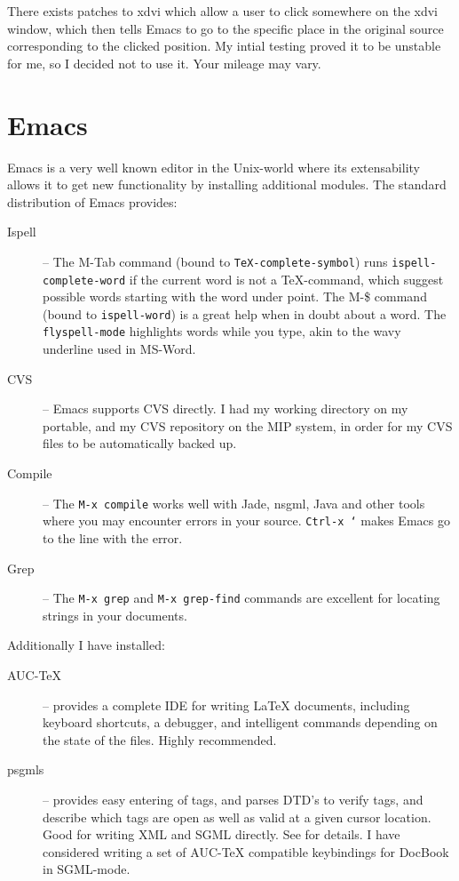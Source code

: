 There exists patches to xdvi which allow a user to click somewhere on
the xdvi window, which then tells Emacs to go to the specific place in
the original source corresponding to the clicked position.  My intial
testing proved it to be unstable for me, so I decided not to use it.
Your mileage may vary.



\section{Emacs} 
\label{sec:report-writing-tools-emacs} 


Emacs is a very well known editor in the Unix-world where its
extensability allows it to get new functionality by installing
additional modules.  The standard distribution of Emacs provides:

\begin{description}
\item[Ispell] -- The M-Tab command (bound to
  \texttt{TeX-complete-symbol}) runs \texttt{ispell-complete-word} if
  the current word is not a {\TeX}-command, which suggest possible
  words starting with the word under point.  The M-\$ command (bound
  to \texttt{ispell-word}) is a great help when in doubt about a
  word.  The \texttt{flyspell-mode} highlights words while you type,
  akin to the wavy underline used in MS-Word. 

\item[CVS] -- Emacs supports CVS directly.  I
  had my working directory on my portable, and my CVS repository on
  the MIP system, in order for my CVS files to be automatically backed
  up. 
\item[Compile] -- The \texttt{M-x compile} works well with Jade,
  nsgml, Java and other tools where you may encounter errors in your
  source.  \texttt{Ctrl-x `} makes Emacs go to the line with the
  error.
\item[Grep] -- The \texttt{M-x grep} and \texttt{M-x grep-find}
  commands are excellent for locating strings in your documents.
\end{description}

Additionally I have installed:


\begin{description}
\item[AUC-TeX] -- provides a complete IDE for writing {\LaTeX}
  documents, including keyboard shortcuts, a debugger, and intelligent
  commands depending on the state of the files. Highly recommended.
  
\item[psgmls] -- provides easy entering of tags, and parses DTD's to
  verify tags, and describe which tags are open as well as valid at a
  given cursor location.  Good for writing XML and SGML directly.  See
   for details.  I have considered writing a set of
  AUC-TeX compatible keybindings for DocBook in SGML-mode.
\end{description}


